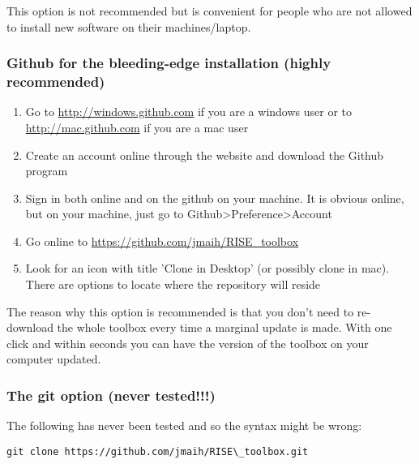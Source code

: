 \documentclass[letterpaper,10pt,english]{sphinxmanual}
\begin{document}
This option is not recommended but is convenient for people
who are not allowed to install new software on their
machines/laptop.


\subsubsection{Github for the bleeding-edge installation (highly recommended)}
\label{getting_started_folder/installation_configuration:github-for-the-bleeding-edge-installation-highly-recommended}\begin{enumerate}
\item {} 
Go to \href{http://windows.github.com}{http://windows.github.com} if you are a windows user or
to \href{http://mac.github.com}{http://mac.github.com} if you are a mac user

\item {} 
Create an account online through the website and download
the Github program

\item {} 
Sign in both online and on the github on your machine. It is
obvious online, but on your machine, just go to
Github\textgreater{}Preference\textgreater{}Account

\item {} 
Go online to \href{https://github.com/jmaih/RISE\_toolbox}{https://github.com/jmaih/RISE\_toolbox}

\item {} 
Look for an icon with title ’Clone in Desktop’ (or possibly
clone in mac). There are options to locate where the
repository will reside

\end{enumerate}

The reason why this option is recommended is that you don't need to
re-download the whole toolbox every time a marginal update is made.
With one click and within seconds you can have the version of the toolbox
on your computer updated.


\subsubsection{The git option (never tested!!!)}
\label{getting_started_folder/installation_configuration:the-git-option-never-tested}
The following has never been tested and so the syntax might be wrong:

\begin{Verbatim}[commandchars=\\\{\}]
git clone https://github.com/jmaih/RISE\_toolbox.git
\end{Verbatim}
\end{document}
